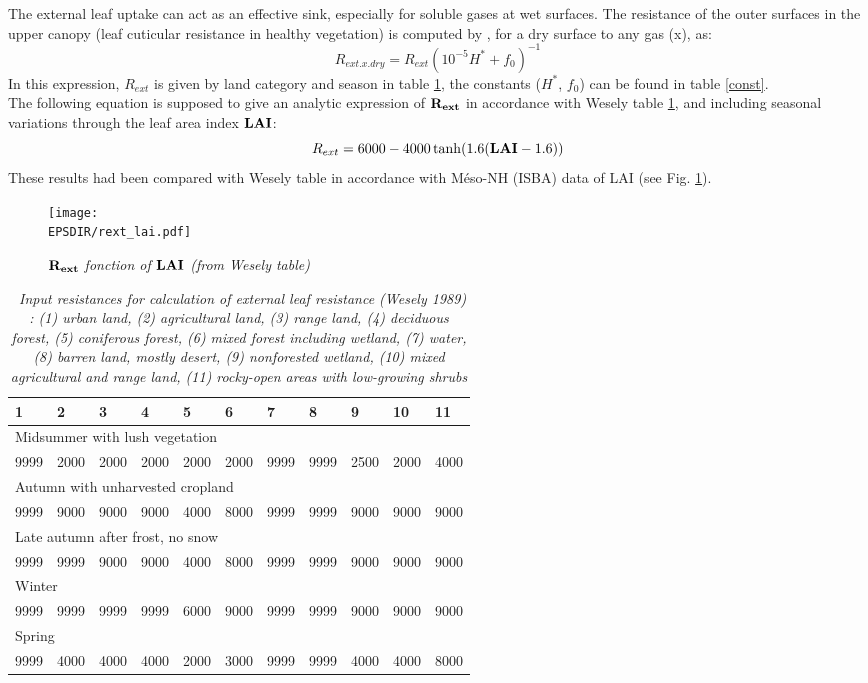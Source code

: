 The external leaf uptake can act as an effective sink, especially for soluble
gases at wet surfaces. 
The resistance of the outer surfaces in the upper canopy (leaf cuticular
resistance in healthy vegetation) is computed by \cite{Wesely1989}, for a
dry surface to any gas (x), as:
\[R_{ext.x.dry}=R_{ext}(10^{-5}H^*+f_0)^{-1}\]
In this expression, $R_{ext}$ is given by land category and season in table
\ref{resdebase},  the constants ($H^*$, $f_0$) can be found in table 
\ref{const}.\\
The following equation is supposed to give an analytic expression of
$\bf{R_{ext}}$ in accordance with Wesely table \ref{resdebase}, and 
including seasonal variations through the leaf area index $\bf LAI$:
\[R_{ext}=6000 - 4000 \tanh(1.6( {\bf{LAI}} -1.6))\]
These results had been compared with Wesely table in accordance with 
Méso-NH (ISBA) data of LAI (see Fig. \ref{lai_rext}).
\begin{figure}
\centerline{\texttt{[image: \\EPSDIR/rext\_lai.pdf]}}
\label{lai_rext}
\caption{\sl{$\bf{R_{ext}}$ fonction of $\bf{LAI}$ (from Wesely table)}}
\end{figure}

\begin{table}
\begin{center}
\begin{tabular}{lllllllllll}
\hline
1&2&3&4&5&6&7&8&9&10&11 \\ \hline
\multicolumn{11}{l}{Midsummer with lush vegetation}\\
9999 & 2000& 2000&   2000   & 2000  & 2000  & 9999 & 9999 & 2500 & 2000 & 4000
\\
\multicolumn{11}{l}{Autumn with unharvested cropland}\\
9999 & 9000& 9000&   9000   & 4000  & 8000  & 9999 & 9999 & 9000 & 9000 & 9000
\\
\multicolumn{11}{l}{Late autumn after frost, no snow}\\
9999 & 9999 & 9000&   9000   & 4000  & 8000  & 9999 & 9999 & 9000 & 9000 & 9000
\\
\multicolumn{11}{l}{Winter}\\
9999 & 9999 & 9999 & 9999 & 6000  & 9000  & 9999 & 9999 & 9000 & 9000 & 9000
\\
\multicolumn{11}{l}{Spring}\\
9999 & 4000& 4000&   4000   & 2000  & 3000  & 9999& 9999&  4000 & 4000 & 8000
\\ \hline
\end{tabular}
\caption { \sl~{Input resistances for calculation of external leaf resistance
(Wesely 1989) : (1) urban land, (2) agricultural land, (3) range land,
(4) deciduous forest, (5) coniferous forest, (6) mixed forest
including wetland, (7) water, (8) barren land, mostly desert,
(9) nonforested wetland, (10) mixed agricultural and range land,
(11) rocky-open areas with low-growing shrubs}} 
\label{resdebase}

\end{center}
\end{table}

